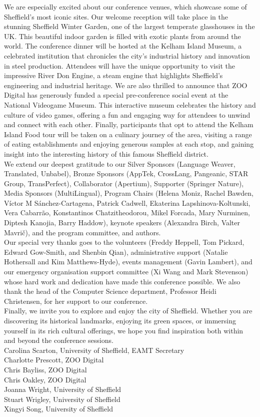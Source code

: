 We are especially excited about our conference venues, which showcase some of Sheffield’s most iconic sites. Our welcome reception will take place in the stunning Sheffield Winter Garden, one of the largest temperate glasshouses in the UK. This beautiful indoor garden is filled with exotic plants from around the world. The conference dinner will be hosted at the Kelham Island Museum, a celebrated institution that chronicles the city’s industrial history and innovation in steel production. Attendees will have the unique opportunity to visit the impressive River Don Engine, a steam engine that highlights Sheffield’s engineering and industrial heritage. We are also thrilled to announce that ZOO Digital has generously funded a special pre-conference social event at the National Videogame Museum. This interactive museum celebrates the history and culture of video games, offering a fun and engaging way for attendees to unwind and connect with each other. Finally, participants that opt to attend the Kelham Island Food tour will be taken on a culinary journey of the area, visiting a range of eating establishments and enjoying generous samples at each stop, and gaining insight into the interesting history of this famous Sheffield district.
\\

We extend our deepest gratitude to our Silver Sponsors (Language Weaver, Translated, Unbabel), Bronze Sponsors (AppTek, CrossLang, Pangeanic, STAR Group, TransPerfect), Collaborator (Apertium), Supporter (Springer Nature), Media Sponsors (MultiLingual), Program Chairs (Helena Moniz, Rachel Bawden, Víctor M Sánchez-Cartagena, Patrick Cadwell, Ekaterina Lapshinova-Koltunski, Vera Cabarrão, Konstantinos Chatzitheodorou, Mikel Forcada, Mary Nurminen, Diptesh Kanojia, Barry Haddow), keynote speakers (Alexandra Birch, Valter Mavrič), and the program committee, and authors.
\\

Our special very thanks goes to the volunteers (Freddy Heppell, Tom Pickard, Edward Gow-Smith, and Shenbin Qian), administrative support (Natalie Hothersall and Kim Matthews-Hyde), events management (Gavin Lambert), and our emergency organisation support committee (Xi Wang and Mark Stevenson) whose hard work and dedication have made this conference possible. We also thank the head of the Computer Science department, Professor Heidi Christensen, for her support to our conference. 
\\

Finally, we invite you to explore and enjoy the city of Sheffield. Whether you are discovering its historical landmarks, enjoying its green spaces, or immersing yourself in its rich cultural offerings, we hope you find inspiration both within and beyond the conference sessions.
\\

Carolina Scarton, University of Sheffield, EAMT Secretary \\
Charlotte Prescott, ZOO Digital \\
Chris Bayliss, ZOO Digital \\
Chris Oakley, ZOO Digital \\
Joanna Wright, University of Sheffield \\
Stuart Wrigley, University of Sheffield \\
Xingyi Song, University of Sheffield \\



